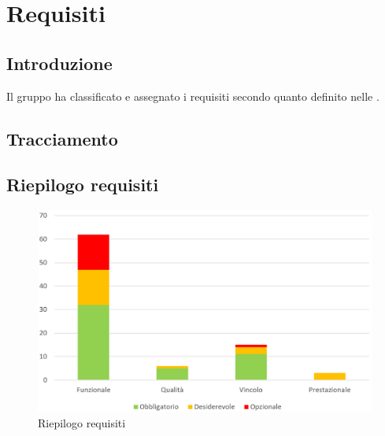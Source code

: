 \section{Requisiti}
\subsection{Introduzione}
Il gruppo \Gruppo{} ha classificato e assegnato i requisiti secondo quanto definito nelle .





\newpage
\subsection{Tracciamento}



\newpage

\subsection{Riepilogo requisiti}

\begin{figure}[h]
\includegraphics[width=15cm]{section/Images/riepilogoReq}
\centering
\caption{Riepilogo requisiti}
\end{figure}
